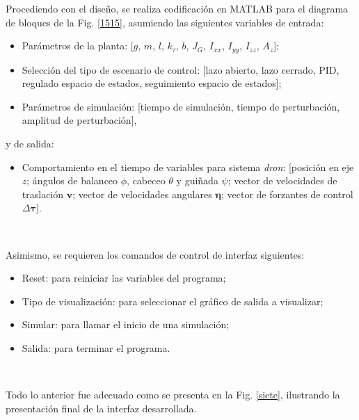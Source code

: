 \noindent Procediendo con el diseño, se realiza codificación en MATLAB para el diagrama de bloques de la Fig. \ref{1515}, asumiendo las siguientes variables de entrada:
\begin{itemize}
    \item Parámetros de la planta: [$g$, $m$, $l$, $k_\tau$, $b$, $J_G$, $I_{xx}$, $I_{yy}$, $I_{zz}$, $A_z$];
    \item Selección del tipo de escenario de control: [lazo abierto, lazo cerrado, PID, regulado espacio de estados, seguimiento espacio de estados];
    \item Parámetros de simulación: [tiempo de simulación, tiempo de perturbación, amplitud de perturbación],
\end{itemize}
y de salida:
\begin{itemize}
 \item Comportamiento en el tiempo de variables para sistema \emph{dron}: [posición en eje $z$; ángulos de balanceo $\phi$, cabeceo $\theta$ y guiñada $\psi$; vector de velocidades de traslación $\mathbf{v}$; vector de velocidades angulares $\mathbf{\eta}$; vector de forzantes de control $\Delta\boldsymbol\tau$].
\end{itemize}\

\noindent Asimismo, se requieren los comandos de control de interfaz siguientes:
\begin{itemize}
 \item Reset: para reiniciar las variables del programa;
 \item Tipo de visualización: para seleccionar el gráfico de salida a visualizar;
 \item Simular: para llamar el inicio de una simulación;
 \item Salida: para terminar el programa.
\end{itemize}\

\noindent Todo lo anterior fue adecuado como se presenta en la Fig. \ref{siete}, ilustrando la presentación final de la interfaz desarrollada.
